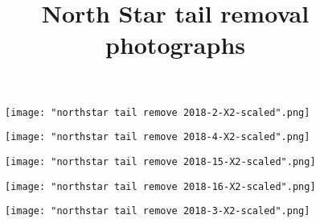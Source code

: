 %


\title{North Star tail removal photographs}

\maketitle


\begin{figure}[httb]
   \vspace{2em}
   \centering
   \texttt{[image: "northstar tail remove 2018-2-X2-scaled".png]}
   \label{fig:stab-one}
\end{figure}

\begin{figure}[httb]
   \vspace{2em}
   \centering
   \texttt{[image: "northstar tail remove 2018-4-X2-scaled".png]}
   \label{fig:stab-one}
\end{figure}

\begin{figure}[httb]
   \vspace{2em}
   \centering
   \texttt{[image: "northstar tail remove 2018-15-X2-scaled".png]}
   \label{fig:stab-one}
\end{figure}

\begin{figure}[httb]
   \vspace{2em}
   \centering
   \texttt{[image: "northstar tail remove 2018-16-X2-scaled".png]}
   \label{fig:stab-one}
\end{figure}

\begin{figure}[httb]
   \vspace{2em}
   \centering
   \texttt{[image: "northstar tail remove 2018-3-X2-scaled".png]}
   \label{fig:stab-one}
\end{figure}

